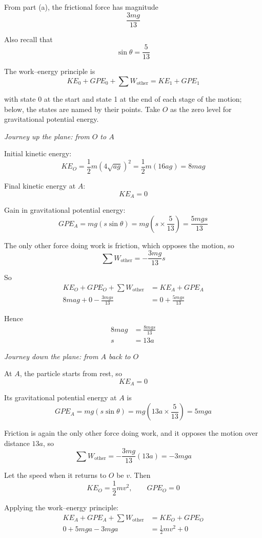 \documentclass[leqno]{article}
\begin{document}
\begin{enumerate}[
  label=\textbf{\arabic*.},
  leftmargin=*,
  topsep=0pt,
  partopsep=0pt,
  parsep=0pt
]
\begin{djsSolution}
\begin{enumerate}[label=\textbf{(\alph*)}]
  From part (a), the frictional force has magnitude
  \[
  \frac{3mg}{13}
  \]

  Also recall that
  \[
  \sin\theta=\frac{5}{13}
  \]

  The work--energy principle is
  \[
  KE_0+GPE_0+\sum W_{\text{other}}=KE_1+GPE_1
  \]

  with state 0 at the start and state 1 at the end of each stage of the motion; below, the states are named by their points. Take $O$ as the zero level for gravitational potential energy.

  \textit{Journey up the plane: from $O$ to $A$}

  Initial kinetic energy:
  \[
  KE_O=\frac12 m\left(4\sqrt{ag}\right)^2=\frac12 m(16ag)=8mag
  \]

  Final kinetic energy at $A$:
  \[
  KE_A=0
  \]

  Gain in gravitational potential energy:
  \[
  GPE_A=mg(s\sin\theta)=mg\left(s\times \frac{5}{13}\right)=\frac{5mgs}{13}
  \]

  The only other force doing work is friction, which opposes the motion, so
  \[
  \sum W_{\text{other}}=-\frac{3mg}{13}s
  \]

  So
  \begin{align*}
  KE_O+GPE_O+\sum W_{\text{other}}&=KE_A+GPE_A \\
  8mag+0-\frac{3mgs}{13}&=0+\frac{5mgs}{13}
  \end{align*}

  Hence
  \begin{align*}
  8mag&=\frac{8mgs}{13} \\
  s&=13a
  \end{align*}

  \textit{Journey down the plane: from $A$ back to $O$}

  At $A$, the particle starts from rest, so
  \[
  KE_A=0
  \]

  Its gravitational potential energy at $A$ is
  \[
  GPE_A=mg(s\sin\theta)=mg\left(13a\times \frac{5}{13}\right)=5mga
  \]

  Friction is again the only other force doing work, and it opposes the motion over distance $13a$, so
  \[
  \sum W_{\text{other}}=-\frac{3mg}{13}(13a)=-3mga
  \]

  Let the speed when it returns to $O$ be $v$. Then
  \[
  KE_O=\frac12 mv^2,\qquad GPE_O=0
  \]

  Applying the work--energy principle:
  \begin{align*}
  KE_A+GPE_A+\sum W_{\text{other}}&=KE_O+GPE_O \\
  0+5mga-3mga&=\frac12 mv^2+0
  \end{align*}


\end{enumerate}
\end{djsSolution}
\end{enumerate}
\end{document}
